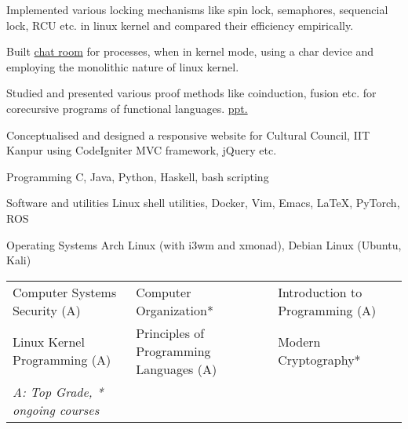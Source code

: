 \documentclass[11pt, a4paper]{cv}
\begin{document}

\begin{cventries}

    \begin{cvitems} %
        \item {Implemented various locking mechanisms like spin lock, semaphores, sequencial lock, RCU etc. in linux kernel and compared their efficiency empirically.}
        \item {Built \href{https://github.com/shivnshu/chatroom}{chat room} for processes, when in kernel mode, using a char device and employing the monolithic nature of linux kernel.}
        \item {Studied and presented various proof methods like coinduction, fusion etc. for corecursive programs of functional languages. \href{http://home.iitk.ac.in/~shivansh/resources/proofmethods-corecursion.pdf}{ppt.}}
        \item {Conceptualised and designed a responsive website for Cultural Council, IIT Kanpur using CodeIgniter MVC framework, jQuery etc.}
    \end{cvitems}

\end{cventries}




\begin{cvskills}

  \cvskill
    {Programming} %
    {C, Java, Python, Haskell, bash scripting} %

  \cvskill
    {Software and utilities} %
    {Linux shell utilities, Docker, Vim, Emacs, \LaTeX, PyTorch, ROS} %

  \cvskill
    {Operating Systems} %
    {Arch Linux (with i3wm and xmonad), Debian Linux (Ubuntu, Kali)} %

\end{cvskills}

\begin{cventries}
        \begin{tabular}{l l l}
                Computer Systems Security (A)& Computer Organization* & Introduction to Programming (A)\\
                Linux Kernel Programming (A) & Principles of Programming Languages (A) & Modern Cryptography*\\
                \textit{\small {\color{lightgray}A: Top Grade, * ongoing courses}}
        \end{tabular}
\vspace{-0.3cm}
\end{cventries}
\end{document}
